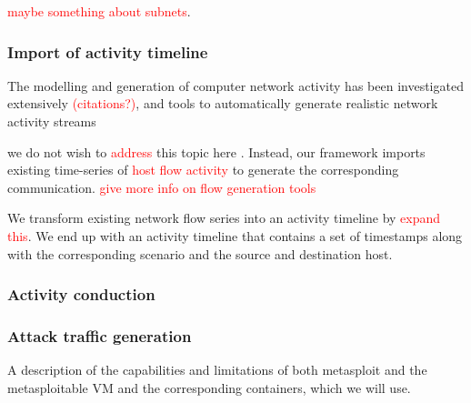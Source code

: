 \documentclass{article}
\begin{document}
\textcolor{red}{maybe something about subnets}. 

\subsubsection*{Import of activity timeline}

The modelling and generation of computer network activity has been investigated extensively \textcolor{red}{(citations?)}, and tools to automatically generate realistic network activity streams 

we do not wish to \textcolor{red}{address} this topic here . Instead, our framework imports existing time-series of \textcolor{red}{host flow activity} to generate the corresponding communication. \textcolor{red}{give more info on flow generation tools} 

We transform existing network flow series into an activity timeline by \textcolor{red}{expand this}. We end up with an activity timeline that contains a set of timestamps along with the corresponding scenario and the source and destination host. 

\subsubsection*{Activity conduction}


\subsubsection*{Attack traffic generation}

A description of the capabilities and limitations of both metasploit and the metasploitable VM and the corresponding containers, which we will use.




\end{document}
